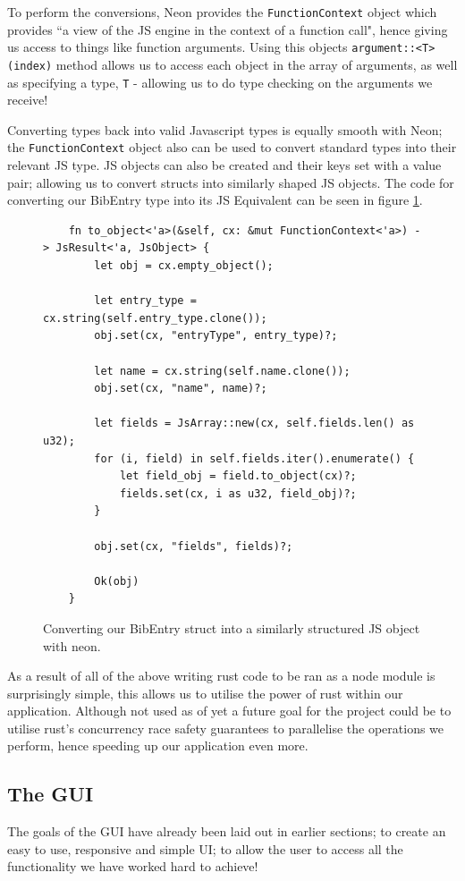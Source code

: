 \documentclass[a4paper,11pt]{article}
\newcommand{\code}[1]{\colorbox{codegray}{\texttt{#1}}}
\begin{document}
To perform the conversions, Neon provides the \code{FunctionContext} object which provides ``a view of the JS engine in the context of a function call", hence giving us access to things like function arguments. Using this objects \code{argument::<T>(index)} method allows us to access each object in the array of arguments, as well as specifying a type, \code{T} - allowing us to do type checking on the arguments we receive!

Converting types back into valid Javascript types is equally smooth with Neon; the \code{FunctionContext} object also can be used to convert standard types into their relevant JS type. JS objects can also be created and their keys set with a value pair; allowing us to convert structs into similarly shaped JS objects. The code for converting our BibEntry type into its JS Equivalent can be seen in figure \ref{fig:bibEntryConversion}.

\begin{figure}
    \begin{verbatim}
    fn to_object<'a>(&self, cx: &mut FunctionContext<'a>) -> JsResult<'a, JsObject> {
        let obj = cx.empty_object();

        let entry_type = cx.string(self.entry_type.clone());
        obj.set(cx, "entryType", entry_type)?;

        let name = cx.string(self.name.clone());
        obj.set(cx, "name", name)?;

        let fields = JsArray::new(cx, self.fields.len() as u32);
        for (i, field) in self.fields.iter().enumerate() {
            let field_obj = field.to_object(cx)?;
            fields.set(cx, i as u32, field_obj)?;
        }

        obj.set(cx, "fields", fields)?;

        Ok(obj)
    }
    \end{verbatim}
    \caption{Converting our BibEntry struct into a similarly structured JS object with neon.}
    \label{fig:bibEntryConversion}
\end{figure}

As a result of all of the above writing rust code to be ran as a node module is surprisingly simple, this allows us to utilise the power of rust within our application. Although not used as of yet a future goal for the project could be to utilise rust's concurrency race safety guarantees to parallelise the operations we perform, hence speeding up our application even more.

\subsection{The GUI}
The goals of the GUI have already been laid out in earlier sections; to create an easy to use, responsive and simple UI; to allow the user to access all the functionality we have worked hard to achieve!
\end{document}
